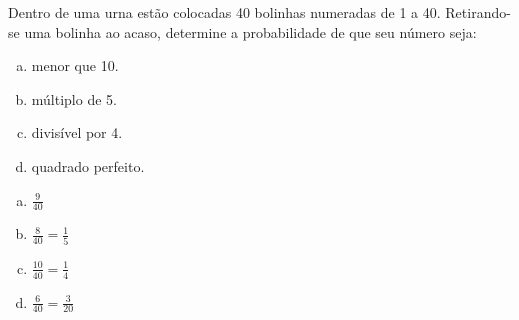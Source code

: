 \begin{ex}
Dentro de uma urna estão colocadas 40 bolinhas numeradas de 1 a 40. Retirando-se uma bolinha ao acaso, determine a probabilidade de que seu número seja:
   \begin{enumerate}[(a)]
   \item menor que 10.
   \item múltiplo de 5.
   \item divisível por 4.
   \item quadrado perfeito.
   \end{enumerate}
     \begin{sol}
       \phantom{A}
        \begin{enumerate} [(a)]
            \item $\frac{9}{40}$
            \item $\frac{8}{40}=\frac{1}{5}$   
            \item $\frac{10}{40}=\frac{1}{4}$
            \item $\frac{6}{40}=\frac{3}{20}$
            \end{enumerate}
     \end{sol}
\end{ex}